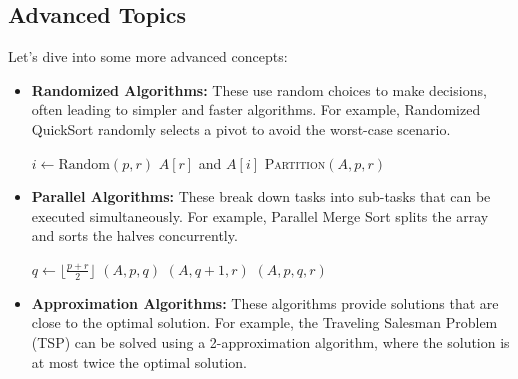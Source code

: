 \documentclass[12pt]{book} %
\begin{document}
\begin{itemize}
\end{itemize}


\subsection{Advanced Topics}
Let's dive into some more advanced concepts:
\begin{itemize}
    \item \textbf{Randomized Algorithms:} These use random choices to make decisions, often leading to simpler and faster algorithms. For example, Randomized QuickSort randomly selects a pivot to avoid the worst-case scenario.
    \begin{algorithm}
        \caption{Randomized QuickSort}
        \begin{algorithmic}[1]
                \State $i \gets \text{Random}(p, r)$
                \State {} $A[r]$ and $A[i]$
                \State \Return \textsc{Partition}$(A, p, r)$
            \EndProcedure
        \end{algorithmic}
    \end{algorithm}


    \item \textbf{Parallel Algorithms:} These break down tasks into sub-tasks that can be executed simultaneously. For example, Parallel Merge Sort splits the array and sorts the halves concurrently.
    \begin{algorithm}
        \caption{Parallel Merge Sort}
        \begin{algorithmic}[1]
                    \State $q \gets \lfloor \frac{p + r}{2} \rfloor$
                    \State {}$(A, p, q)$
                    \State {}$(A, q+1, r)$
                    \State {}$(A, p, q, r)$
                \EndIf
            \EndProcedure
        \end{algorithmic}
    \end{algorithm}
  

    \item \textbf{Approximation Algorithms:} These algorithms provide solutions that are close to the optimal solution. For example, the Traveling Salesman Problem (TSP) can be solved using a 2-approximation algorithm, where the solution is at most twice the optimal solution.
\end{itemize}
\end{document}
